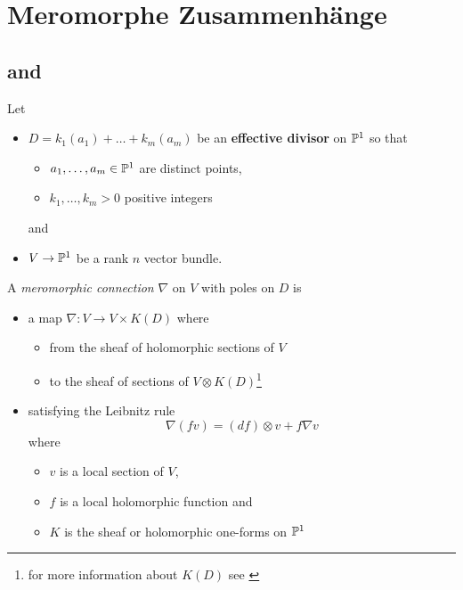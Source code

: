 \chapter{Meromorphe Zusammenhänge}
\begin{comment}
  Siehe:
  \begin{itemize}
    \item \cite{boalch} and \cite{thboalch}
    \item \cite{sabbah2007isomonodromic}
  \end{itemize}
\end{comment}

\section{\cite{boalch} and \cite{thboalch}}
Let
\begin{itemize}
  \item $D=k_1(a_1)+\dots+k_m(a_m)$ be an \textbf{effective divisor} on $\P^1$
    so that
    \begin{itemize}
      \item $a_1,\dots,a_m\in\P^1$ are distinct points,
      \item $k_1,\dots,k_m>0$ positive integers
    \end{itemize}
    and
  \item $V\to\P^1$ be a rank $n$ vector bundle.
\end{itemize}
\begin{defn}[2.1]
  A \emph{meromorphic connection} $\nabla$ on $V$ with poles on $D$ is
  \begin{itemize}
    \item a map $\nabla:V\to V\times K(D)$ where
      \begin{itemize}
        \item from the sheaf of holomorphic sections of $V$
        \item to the sheaf of sections of $V\otimes K(D)$\footnote{for more
          information about $K(D)$ see \cite{beauville1996complex}}
      \end{itemize}
    \item satisfying the Leibnitz rule
      \begin{equation}
        \nabla(fv)=(df)\otimes v + f\nabla v
      \end{equation}
      where
      \begin{itemize}
        \item $v$ is a local section of $V$,
        \item $f$ is a local holomorphic function and
        \item $K$ is the sheaf or holomorphic one-forms on $\P^1$
      \end{itemize}
  \end{itemize}
\end{defn}

